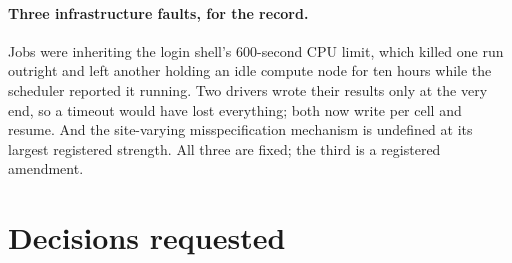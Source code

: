 \documentclass[11pt,a4paper]{article}
\begin{document}
\paragraph{Three infrastructure faults, for the record.}
Jobs were inheriting the login shell's $600$-second CPU limit, which killed one run outright and
left another holding an idle compute node for ten hours while the scheduler reported it running.
Two drivers wrote their results only at the very end, so a timeout would have lost everything; both
now write per cell and resume. And the site-varying misspecification mechanism is undefined at its
largest registered strength. All three are fixed; the third is a registered amendment.

\section{Decisions requested}\label{sec:ask}
\end{document}
